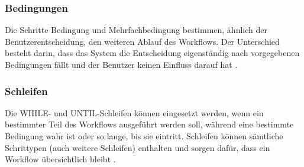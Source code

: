 \subsubsection{Bedingungen}
Die Schritte Bedingung und Mehrfachbedingung bestimmen, ähnlich der Benutzerentscheidung, den weiteren Ablauf des Workflows. Der Unterschied besteht darin, dass das System die Entscheidung eigenständig nach vorgegebenen Bedingungen fällt und der Benutzer keinen Einfluss darauf hat \cite{SAPHelp}.

\subsubsection{Schleifen}
Die WHILE- und UNTIL-Schleifen können eingesetzt werden, wenn ein bestimmter Teil des Workflows ausgeführt werden soll, während eine bestimmte Bedingung wahr ist oder so lange, bis sie eintritt. Schleifen können sämtliche Schrittypen (auch weitere Schleifen) enthalten und sorgen dafür, dass ein Workflow übersichtlich bleibt \cite{SAPHelp}.

